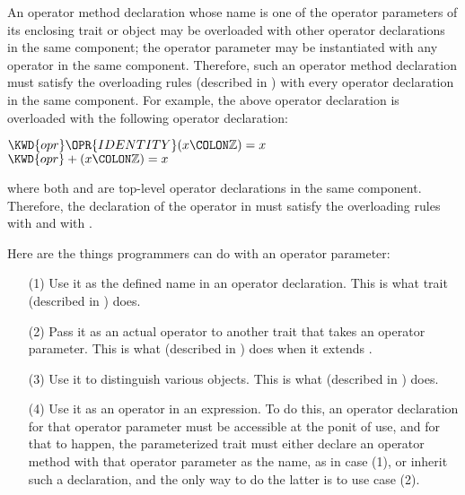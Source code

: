An operator method declaration whose name is one of the operator parameters
of its enclosing trait or object may be overloaded with other operator
declarations in the same component; the operator parameter may be instantiated
with any operator in the same component.  Therefore, such an operator method
declaration must satisfy the overloading rules
(described in ) with every operator declaration
in the same component.
For example, the above  operator declaration is overloaded
with the following  operator declaration:
\begin{Fortress}
\(\KWD{opr} \mathord{\OPR{IDENTITY}}(x\COLON \mathbb{Z}) = x\)\\
\(\KWD{opr} +(x\COLON \mathbb{Z}) = x\)
\end{Fortress}
where both  and \EXP{+} are top-level operator declarations
in the same component.
Therefore, the declaration of the operator \EXP{\odot} in 
must satisfy the overloading rules with  and with \EXP{+}.


Here are the things programmers can do with an operator parameter:
\begin{enumerate}
\item[(1)] Use it as the defined name in an operator declaration.
    This is what trait
(described in ) does.

\item[(2)] Pass it as an actual operator to another trait that takes
     an operator parameter.  This is what
(described in ) does when it extends
.

\item[(3)] Use it to distinguish various objects.
    This is what
(described in ) does.

\item[(4)] Use it as an operator in an expression.
    To do this, an operator declaration for that operator parameter
    must be accessible at the ponit of use, and for that to
    happen, the parameterized trait must either declare
    an operator method with that operator parameter as the name,
    as in case (1), or inherit such a declaration, and the
    only way to do the latter is to use case (2).
\end{enumerate}

